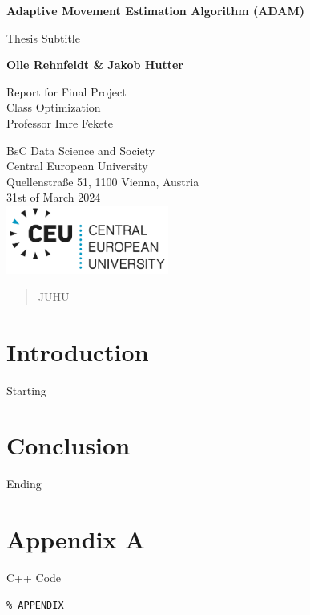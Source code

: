 \documentclass[journal, letterpaper]{IEEEtran}
\begin{document}
\begin{titlepage}
   \begin{center}
       \vspace*{1cm}

       \textbf{Adaptive Movement Estimation Algorithm (ADAM)}

       \vspace{0.5cm}
        Thesis Subtitle
            
       \vspace{1.5cm}

       \textbf{Olle Rehnfeldt \& Jakob Hutter}

       \vfill
            
       Report for Final Project\\
       Class Optimization\\
       Professor Imre Fekete
            
       \vspace{2cm}
       BsC Data Science and Society\\
       Central European University\\
       Quellenstraße 51, 1100 Vienna, Austria\\
       31st of March 2024\\
       \vspace{1.5cm}
       \includegraphics[width=0.4\textwidth]{figures/CEU_Logo_RGB_DualColor.png}
       
            
   \end{center}
\end{titlepage}
\begin{abstract}
    JUHU
\end{abstract}


\section{Introduction}
Starting	




 
\section{Conclusion}
Ending




\onecolumn
\textwidth=456pt
\paperwidth=577pt
\hoffset=-30pt
\newpage
\newpage
\clearpage
\pagestyle{headings}



\section{Appendix A}
\centering C++ Code
\footnotesize
\begin{lstlisting}
% APPENDIX
\end{lstlisting}
\normalsize
\pagestyle{headings}
\end{document}
